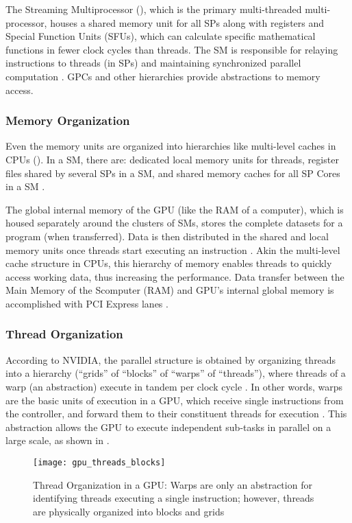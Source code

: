 The Streaming Multiprocessor (), which is the primary multi-threaded multi-processor, houses a shared memory unit for all SPs along with registers and Special Function Units (SFUs), which can calculate specific mathematical functions in fewer clock cycles than threads. The SM is responsible for relaying instructions to threads (in SPs) and maintaining synchronized parallel computation \cite{DemystifyingGPU,PascalWhitepaper}. GPCs and other hierarchies provide abstractions to memory access.

\subsubsection{Memory Organization}
Even the memory units are organized into hierarchies like multi-level caches in CPUs (). In a SM, there are: dedicated local memory units for threads, register files shared by several SPs in a SM, and shared memory caches for all SP Cores in a SM \cite{PascalWhitepaper,ParallelNVIDIA}.

The global internal memory of the GPU (like the RAM of a computer), which is housed separately around the clusters of SMs, stores the complete datasets for a program (when transferred). Data is then distributed in the shared and local memory units once threads start executing an instruction \cite[Appendix~B]{PattersonARM}. Akin the multi-level cache structure in CPUs, this hierarchy of memory enables threads to quickly access working data, thus increasing the performance. Data transfer between the Main Memory of the Scomputer (RAM) and GPU's internal global memory is accomplished with PCI Express lanes \cite{PascalWhitepaper,ParallelNVIDIA}.

\subsubsection{Thread Organization}
According to NVIDIA, the parallel structure is obtained by organizing threads into a hierarchy (``grids'' of ``blocks'' of ``warps'' of ``threads''), where threads of a warp (an abstraction) execute in tandem per clock cycle \cite{CUDADocs,PattersonARM,DemystifyingGPU}. In other words, warps are the basic units of execution in a GPU, which receive single instructions from the controller, and forward them to their constituent threads for execution \cite{CUDADocs,DemystifyingGPU}. This abstraction allows the GPU to execute independent sub-tasks in parallel on a large scale, as shown in .
\begin{figure}[!htbp]
    \centering
    \texttt{[image: gpu\_threads\_blocks]}
    \caption[Thread Organization in a GPU]{Thread Organization in a GPU: Warps are only an abstraction for identifying threads executing a single instruction; however, threads are physically organized into blocks and grids \cite{CUDADocs,ParallelNVIDIA}}
    \label{fig:GPU - Thread Organization in a GPU}
\end{figure}

